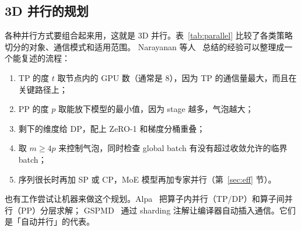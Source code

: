 \subsection{3D 并行的规划}

各种并行方式要组合起来用，这就是 3D 并行。表~\ref{tab:parallel} 比较了各类策略切分的对象、通信模式和适用范围。
Narayanan 等人~\cite{narayanan2021efficient} 总结的经验可以整理成一个能复述的流程：
\begin{enumerate}
\item TP 的度 $t$ 取节点内的 GPU 数（通常是 8），因为 TP 的通信量最大，而且在关键路径上；
\item PP 的度 $p$ 取能放下模型的最小值，因为 stage 越多，气泡越大；
\item 剩下的维度给 DP，配上 ZeRO-1 和梯度分桶重叠；
\item 取 $m\ge4p$ 来控制气泡，同时检查 global batch 有没有超过收敛允许的临界 batch；
\item 序列很长时再加 SP 或 CP，MoE 模型再加专家并行（第~\ref{sec:eff} 节）。
\end{enumerate}
也有工作尝试让机器来做这个规划。Alpa~\cite{zheng2022alpa} 把算子内并行（TP/DP）和算子间并行（PP）分层求解；
GSPMD~\cite{xu2021gspmd} 通过 sharding 注解让编译器自动插入通信。它们是「自动并行」的代表。

